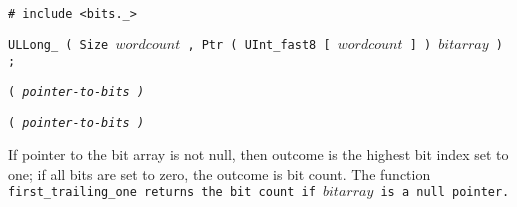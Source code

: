 
\tt{# include <bits._>}

\tt{ULLong_} \s\s\tt{( Size} $wordcount$
\tt{, Ptr ( UInt_fast8 [} $wordcount$ \tt{] )} $bitarray$ \tt{) ;}

\s\s
\tt{(} \it{pointer-to-bits} \tt{)}

\s\s\s
\tt{(} \it{pointer-to-bits} \tt{)}


If pointer to the bit array is not null, then outcome is the highest bit
index set to one; if all bits are set to zero, the outcome is bit count.
The function \tt{first_trailing_one} returns
the bit count if $bitarray$ is a null pointer.
